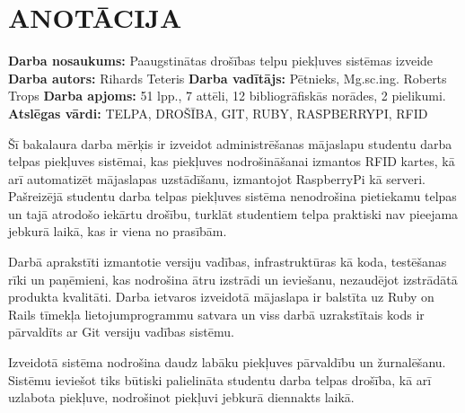 \chapter*{ANOTĀCIJA}
\noindent \textbf{Darba nosaukums:} Paaugstinātas drošības telpu piekļuves sistēmas izveide\newline
\textbf{Darba autors:} Rihards Teteris\newline
\textbf{Darba vadītājs:} Pētnieks, Mg.sc.ing. Roberts Trops\newline
\textbf{Darba apjoms:} 51 lpp., 7 attēli, 12 bibliogrāfiskās norādes, 2 pielikumi.\newline
\textbf{Atslēgas vārdi:} TELPA, DROŠĪBA, GIT, RUBY, RASPBERRYPI, RFID\newline

Šī bakalaura darba mērķis ir izveidot administrēšanas mājaslapu studentu darba telpas piekļuves sistēmai, kas piekļuves nodrošināšanai izmantos RFID kartes, kā arī automatizēt mājaslapas uzstādīšanu, izmantojot RaspberryPi kā serveri. Pašreizējā studentu darba telpas piekļuves sistēma nenodrošina pietiekamu telpas un tajā atrodošo iekārtu drošību, turklāt studentiem telpa praktiski nav pieejama jebkurā laikā, kas ir viena no prasībām.

Darbā aprakstīti izmantotie versiju vadības, infrastruktūras kā koda, testēšanas rīki un paņēmieni, kas nodrošina ātru izstrādi un ieviešanu, nezaudējot izstrādātā produkta kvalitāti. Darba ietvaros izveidotā mājaslapa ir balstīta uz Ruby on Rails tīmekļa lietojumprogrammu satvara un viss darbā uzrakstītais kods ir pārvaldīts ar Git versiju vadības sistēmu.

Izveidotā sistēma nodrošina daudz labāku piekļuves pārvaldību un žurnalēšanu. Sistēmu ieviešot tiks būtiski palielināta studentu darba telpas drošība, kā arī uzlabota piekļuve, nodrošinot piekļuvi jebkurā diennakts laikā.